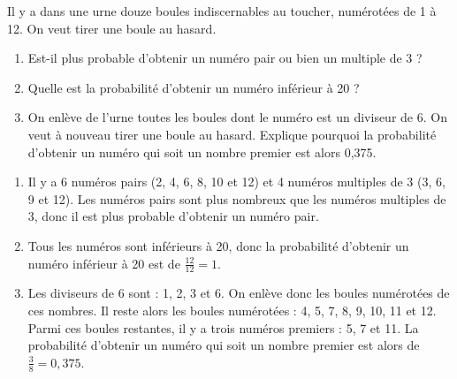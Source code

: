 \begin{exercice*}
    Il y a dans une urne douze boules indiscernables au toucher, numérotées de 1 à 12. On veut tirer une boule au hasard.

    \begin{enumerate}
        \item Est-il plus probable d'obtenir un numéro pair ou bien un multiple de 3 ?
        \item Quelle est la probabilité d'obtenir un numéro inférieur à 20 ?
        \item On enlève de l'urne toutes les boules dont le numéro est un diviseur de 6. On veut à nouveau tirer une boule au hasard. Explique pourquoi la probabilité d'obtenir un numéro qui soit un nombre premier est alors 0,375.
    \end{enumerate}
\end{exercice*}
\begin{corrige}
    \begin{enumerate}
        \item Il y a 6 numéros pairs (2, 4, 6, 8, 10 et 12) et 4 numéros multiples de 3 (3, 6, 9 et 12). Les numéros pairs sont plus nombreux que les numéros multiples de 3, donc il est plus probable d'obtenir un numéro pair.
        \item Tous les numéros sont inférieurs à 20, donc la probabilité d'obtenir un numéro inférieur à 20 est de $\frac{12}{12} = 1$.
        \item Les diviseurs de 6 sont : 1, 2, 3 et 6. On enlève donc les boules numérotées de ces nombres. Il reste alors les boules numérotées : 4, 5, 7, 8, 9, 10, 11 et 12. Parmi ces boules restantes, il y a trois numéros premiers : 5, 7 et 11. La probabilité d'obtenir un numéro qui soit un nombre premier est alors de $\frac{3}{8} = 0,375$.
    \end{enumerate}
\end{corrige}

